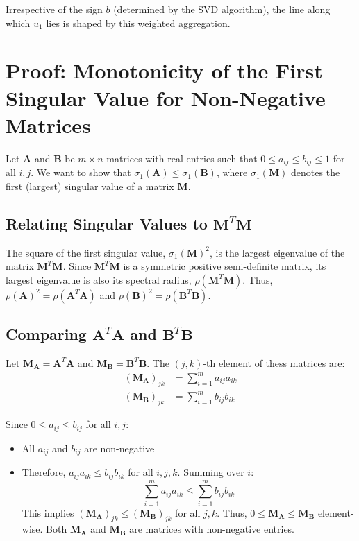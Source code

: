 Irrespective of the sign $b$ (determined by the SVD algorithm), the line along
which $u_1$ lies is shaped by this weighted aggregation.

\section{Proof: Monotonicity of the First Singular Value for Non-Negative Matrices}
Let $\mathbf{A}$ and $\mathbf{B}$ be $m \times n$ matrices with real entries
such that $0 \leq a_{ij} \leq b_{ij} \leq 1$ for all $i,j$. We want to show that
$\sigma_1(\mathbf{A}) \leq \sigma_1(\mathbf{B})$, where $\sigma_1(\mathbf{M})$
denotes the first (largest) singular value of a matrix $\mathbf{M}$.

\subsection{Relating Singular Values to $\mathbf{M}^T\mathbf{M}$}
\label{sec:mono-one}
The square of the first singular value, $\sigma_1(\mathbf{M})^2$, is the largest
eigenvalue of the matrix $\mathbf{M}^T\mathbf{M}$. Since
$\mathbf{M}^T\mathbf{M}$ is a symmetric positive semi-definite matrix, its
largest eigenvalue is also its spectral radius, $\rho(\mathbf{M}^T\mathbf{M})$.
Thus, $\rho(\mathbf{A})^2 = \rho(\mathbf{A}^T\mathbf{A})$ and
$\rho(\mathbf{B})^2 = \rho(\mathbf{B}^T\mathbf{B})$.

\subsection{Comparing $\mathbf{A}^T\mathbf{A}$ and $\mathbf{B}^T\mathbf{B}$}
Let $\mathbf{M}_{\mathbf{A}} = \mathbf{A}^T\mathbf{A}$ and
$\mathbf{M}_{\mathbf{B}} = \mathbf{B}^T\mathbf{B}$. The $(j,k)$-th element of
thess matrices are:
\begin{align}
    (\mathbf{M}_{\mathbf{A}})_{jk} &= \sum_{i=1}^m a_{ij}a_{ik} \\
    (\mathbf{M}_{\mathbf{B}})_{jk} &= \sum_{i=1}^m b_{ij}b_{ik}
\end{align}

Since $0 \leq a_{ij} \leq b_{ij}$ for all $i,j$:
\begin{itemize}
    \item All $a_{ij}$ and $b_{ij}$ are non-negative
    \item Therefore, $a_{ij}a_{ik} \leq b_{ij}b_{ik}$ for all $i,j,k$. Summing
        over $i$:
        \[ \sum_{i=1}^m a_{ij}a_{ik} \leq \sum_{i=1}^m b_{ij}b_{ik} \]
        This implies $(\mathbf{M}_{\mathbf{A}})_{jk} \leq
        (\mathbf{M}_{\mathbf{B}})_{jk}$ for all $j,k$. Thus, $0 \leq
        \mathbf{M}_{\mathbf{A}} \leq \mathbf{M}_{\mathbf{B}}$ element-wise. Both
        $\mathbf{M}_{\mathbf{A}}$ and $\mathbf{M}_{\mathbf{B}}$ are matrices
        with non-negative entries.
\end{itemize}

